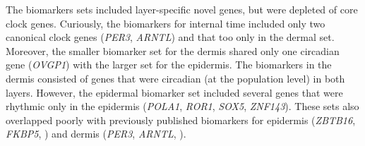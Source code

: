 The biomarkers sets included layer-specific novel genes, but were depleted of core clock genes. Curiously, the biomarkers for internal time included only two canonical clock genes (\textit{PER3}, \textit{ARNTL}) and that too only in the dermal set. Moreover, the smaller biomarker set for the dermis shared only one circadian gene (\textit{OVGP1}) with the larger set for the epidermis. The biomarkers in the dermis consisted of genes that were circadian (at the population level) in both layers. However, the epidermal biomarker set included several genes that were rhythmic only in the epidermis (\textit{POLA1}, \textit{ROR1}, \textit{SOX5}, \textit{ZNF143}). These sets also overlapped poorly with previously published biomarkers for epidermis (\textit{ZBTB16}, \textit{FKBP5}, \cite{Wu2018}) and dermis (\textit{PER3}, \textit{ARNTL}, \cite{Wu2020}). 

\\



